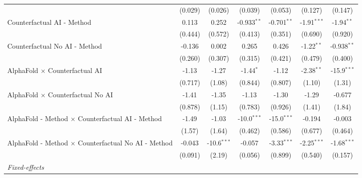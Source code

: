 \begin{tabular}{lcccccc}
                                                              & (0.029)      & (0.026)       & (0.039)       & (0.053)       & (0.127)       & (0.147)\\   
   Counterfactual AI - Method                                 & 0.113        & 0.252         & -0.933$^{**}$ & -0.701$^{**}$ & -1.91$^{***}$ & -1.94$^{**}$\\   
                                                              & (0.444)      & (0.572)       & (0.413)       & (0.351)       & (0.690)       & (0.920)\\   
   Counterfactual No AI - Method                              & -0.136       & 0.002         & 0.265         & 0.426         & -1.22$^{**}$  & -0.938$^{**}$\\   
                                                              & (0.260)      & (0.307)       & (0.315)       & (0.421)       & (0.479)       & (0.400)\\   
   AlphaFold $\times$ Counterfactual AI                       & -1.13        & -1.27         & -1.44$^{*}$   & -1.12         & -2.38$^{**}$  & -15.9$^{***}$\\   
                                                              & (0.717)      & (1.08)        & (0.844)       & (0.807)       & (1.10)        & (1.31)\\   
   AlphaFold $\times$ Counterfactual No AI                    & -1.41        & -1.35         & -1.13         & -1.30         & -1.29         & -0.677\\   
                                                              & (0.878)      & (1.15)        & (0.783)       & (0.926)       & (1.41)        & (1.84)\\   
   AlphaFold - Method $\times$ Counterfactual AI - Method     & -1.49        & -1.03         & -10.0$^{***}$ & -15.0$^{***}$ & -0.194        & -0.003\\   
                                                              & (1.57)       & (1.64)        & (0.462)       & (0.586)       & (0.677)       & (0.464)\\   
   AlphaFold - Method $\times$ Counterfactual No AI - Method  & -0.043       & -10.6$^{***}$ & -0.057        & -3.33$^{***}$ & -2.25$^{***}$ & -1.68$^{***}$\\   
                                                              & (0.091)      & (2.19)        & (0.056)       & (0.899)       & (0.540)       & (0.157)\\   
   \midrule
   \emph{Fixed-effects}\\

\end{tabular}
